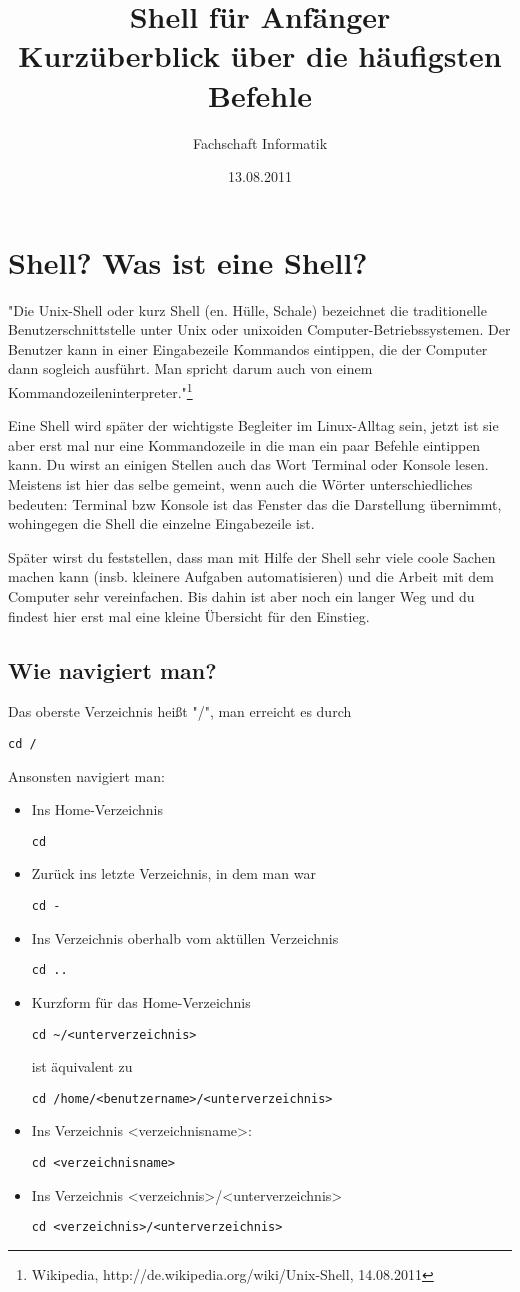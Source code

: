 \documentclass[a4paper,10pt]{article}
\title{Shell für Anfänger\\
\large{Kurzüberblick über die häufigsten Befehle}}
\author{Fachschaft Informatik}
\date{13.08.2011}
\newcommand{\befehl}[1]{
  \begin{center}
    \texttt{#1}
  \end{center}
}
\begin{document}
  \maketitle

  \tableofcontents

  \section{Shell? Was ist eine Shell?}
    "Die Unix-Shell oder kurz Shell (en. Hülle, Schale) bezeichnet die traditionelle Benutzerschnittstelle unter Unix oder unixoiden Computer-Betriebssystemen. Der Benutzer kann in einer Eingabezeile Kommandos eintippen, die der Computer dann sogleich ausführt. Man spricht darum auch von einem Kommandozeileninterpreter."\footnote{Wikipedia, http://de.wikipedia.org/wiki/Unix-Shell, 14.08.2011}

Eine Shell wird später der wichtigste Begleiter im Linux-Alltag sein, jetzt ist sie aber erst mal nur eine Kommandozeile in die man ein paar Befehle eintippen kann. Du wirst an einigen Stellen auch das Wort Terminal oder Konsole lesen. Meistens ist hier das selbe gemeint, wenn auch die Wörter unterschiedliches bedeuten: Terminal bzw Konsole ist das Fenster das die Darstellung übernimmt, wohingegen die Shell die einzelne Eingabezeile ist.

Später wirst du feststellen, dass man mit Hilfe der Shell sehr viele coole Sachen machen kann (insb. kleinere Aufgaben automatisieren) und die Arbeit mit dem Computer sehr vereinfachen. Bis dahin ist aber noch ein langer Weg und du findest hier erst mal eine kleine Übersicht für den Einstieg.
    \subsection{Wie navigiert man?}
      Das oberste Verzeichnis heißt "/", man erreicht es durch 
      \befehl{cd /}
      Ansonsten navigiert man:
      \begin{itemize}
	\item Ins Home-Verzeichnis 
	  \befehl{cd}
	\item Zurück ins letzte Verzeichnis, in dem man war 
	  \befehl{cd -}
	\item Ins Verzeichnis oberhalb vom aktüllen Verzeichnis 
	  \befehl{cd ..} 
	\item  Kurzform für das Home-Verzeichnis 
	  \befehl{cd \textasciitilde/<unterverzeichnis>} 
	  ist äquivalent zu 
	  \befehl{cd /home/<benutzername>/<unterverzeichnis>}
	\item Ins Verzeichnis <verzeichnisname>: 
	  \befehl{cd <verzeichnisname>}
	\item Ins Verzeichnis <verzeichnis>/<unterverzeichnis> 
	  \befehl{cd <verzeichnis>/<unterverzeichnis>}
      \end{itemize}
\end{document}

